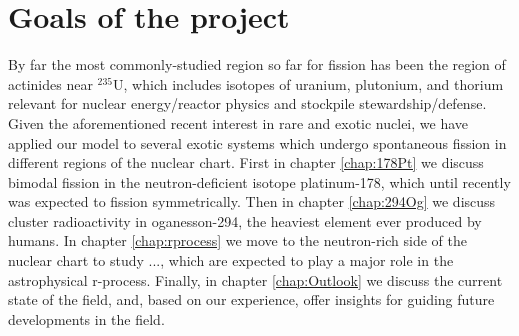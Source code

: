 \section{Goals of the project}
By far the most commonly-studied region so far for fission has been the region of actinides near $^{235}$U, which includes isotopes of uranium, plutonium, and thorium relevant for nuclear energy/reactor physics and stockpile stewardship/defense. Given the aforementioned recent interest in rare and exotic nuclei, we have applied our model to several exotic systems which undergo spontaneous fission in different regions of the nuclear chart. First in chapter \ref{chap:178Pt} we discuss bimodal fission in the neutron-deficient isotope platinum-178, which until recently was expected to fission symmetrically. Then in chapter \ref{chap:294Og} we discuss cluster radioactivity in oganesson-294, the heaviest element ever produced by humans. In chapter \ref{chap:rprocess} we move to the neutron-rich side of the nuclear chart to study ..., which are expected to play a major role in the astrophysical r-process. Finally, in chapter \ref{chap:Outlook} we discuss the current state of the field, and, based on our experience, offer insights for guiding future developments in the field.